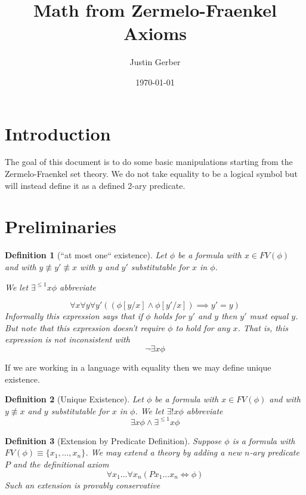 \documentclass[12pt]{article}
\theoremstyle{break}
\newtheorem{definition}{Definition}[section]
\theoremstyle{break}
\theoremstyle{break}
\theoremstyle{break}
\theoremstyle{break}
\newtheorem{informal definition}[definition]{Informal Definition}
\begin{document}
\title{Math from Zermelo-Fraenkel Axioms}
\author{Justin Gerber}
\date{\today}
\maketitle

\section{Introduction}
The goal of this document is to do some basic manipulations starting from the Zermelo-Fraenkel set theory.
We do not take equality to be a logical symbol but will instead define it as a defined 2-ary predicate.

\section{Preliminaries}

\begin{definition}[``at most one`` existence]
Let $\phi$ be a formula with $x\in FV(\phi)$ and with $y\not\equiv y' \not \equiv x$ with $y$ and $y'$ substitutable for $x$ in $\phi$.

We let $\exists^{\leqslant 1} x\phi$ abbreviate

$$
\forall x\forall y \forall y' ((\phi[y/x]\land \phi[y'/x]) \implies y'=y)
$$
Informally this expression says that if $\phi$ holds for $y'$ and $y$ then $y'$ must equal $y$.
But note that this expression doesn't require $\phi$ to hold for any $x$.
That is, this expression is not inconsistent with
$$
\lnot\exists x \phi
$$
\end{definition}

If we are working in a language with equality then we may define unique existence.
\begin{definition}[Unique Existence]
Let $\phi$ be a formula with $x\in FV(\phi)$ and with $y\not \equiv x$ and $y$ substitutable for $x$ in $\phi$.
We let $\exists ! x \phi$ abbreviate
$$
\exists x \phi \land \exists^{\leqslant 1} x \phi
$$
\end{definition}

\begin{definition}[Extension by Predicate Definition]
Suppose $\phi$ is a formula with $FV(\phi) \equiv \{x_1,\ldots, x_n\}$.
We may extend a theory by adding a new $n$-ary predicate $P$ and the definitional axiom
$$
\forall x_1 \ldots \forall x_n (Px_1\ldots x_n \iff \phi)
$$
Such an extension is provably conservative
\end{definition}
\end{document}
